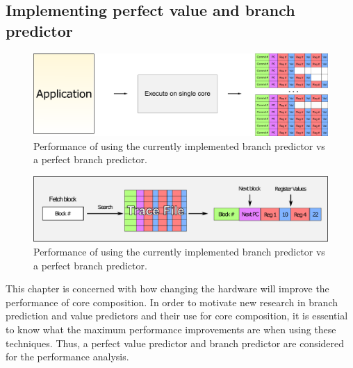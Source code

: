 \subsection{Implementing perfect value and branch predictor}

\begin{figure}[t]
    \centering
    \includegraphics[width=1\textwidth]{chapter3/graphics/trace-gen.pdf}

    \caption{Performance of  using the currently implemented branch predictor vs a perfect branch predictor.}
    \label{fig:trace-gen}
	\vspace{1em}
\end{figure}

\begin{figure}[t]
    \centering
    \includegraphics[width=1\textwidth]{chapter3/graphics/fetching-trace.pdf}

    \caption{Performance of  using the currently implemented branch predictor vs a perfect branch predictor.}
    \label{fig:trace-gen}
	\vspace{1em}
\end{figure}
This chapter is concerned with how changing the hardware will improve the performance of core composition.
In order to motivate new research in branch prediction and value predictors and their use for core composition, it is essential to know what the maximum performance improvements are when using these techniques. %
Thus, a perfect value predictor and branch predictor are considered for the performance analysis.
